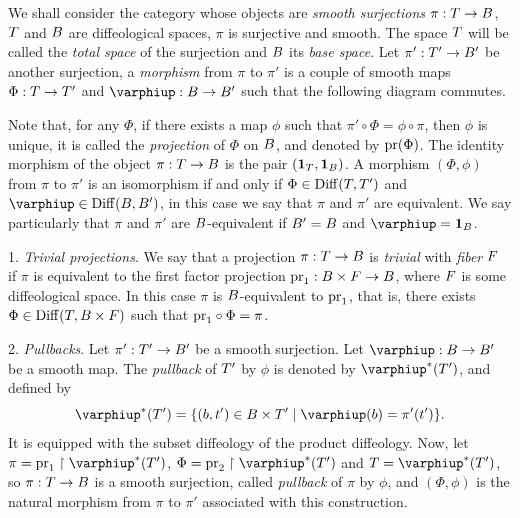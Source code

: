 \begin{article}
  \label{The-category-of-smooth-surjections}
  We shall consider the category whose objects are {\em smooth surjections} $\pi:T \to B$,
  $T$ and $B$ are diffeological spaces,
  $\pi$ is surjective and smooth.
  The space $T$ will be called the {\em total space} of the surjection and $B$ its {\em base space}.
  Let $\pi' : T' \to B'$ be another surjection,
  a {\em morphism} from $\pi$ to $\pi'$ is a couple of smooth maps $\Phi : T \to T'$ and $\phi : \B \to \B'$ such that the following diagram commutes.
  
  \begin{center}
  \end{center}

  Note that,
  for any $\Phi$,
  if there exists a map $\phi$ such that $\pi' \circ \Phi = \phi \circ \pi$,
  then $\phi$ is unique,
  it is called the {\em projection} of $\Phi$ on $B$,
  and denoted by $\mathrm{pr}(\Phi)$.
  The identity morphism of the object $\pi : T \to B$ is the pair $({\bf 1}_T, {\bf 1}_B)$.
  A morphism $(\Phi,\phi)$ from $\pi$ to $\pi'$ is an isomorphism if and only if $\Phi \in \mathrm{Diff}(T,T')$ and $\phi \in \Diff(\B,\B')$,
  in this case we say that $\pi$ and $\pi'$ are equivalent.
  We say particularly that $\pi$ and $\pi'$ are $B$-equivalent if $B'= B$ and $\phi = \id_\B$.
  
  1. {\em Trivial projections}.
  We say that a projection $\pi : T \to B$ is {\em trivial} with {\em fiber} $F$ if $\pi$ is equivalent to the first factor projection $\mathrm{pr}_1 : B \times F \to B$,
  where $F$ is some diffeological space.
  In this case $\pi$ is $B$-equivalent to $\mathrm{pr}_1$,
  that is,
  there exists $\Phi \in \mathrm{Diff}(T,B \times F)$ such that $\mathrm{pr}_1 \circ \Phi = \pi$.
  
  2. {\em Pullbacks}.
  Let $\pi' : T' \to B'$ be a smooth surjection.
  Let $\phi : \B \to \B'$ be a smooth map.
  The {\em pullback} of $T'$ by $\phi$ is denoted by $\phi^*(\T')$,
  and defined by
  $$%
  \phi^*(\T') = \{ (b,t') \in \B \times \T' \mid \phi(b) = \pi'(t') \}.
  $$%
  It is equipped with the subset diffeology of the product diffeology.
  Now,
  let $\pi = \pr_1 \restriction \phi^*(\T')$, $\Phi = \pr_2 \restriction \phi^*(\T')$ and $\T = \phi^*(\T')$, so $\pi : T \to B$ is a smooth surjection,
  called {\em pullback} of $\pi$ by $\phi$,
  and $(\Phi, \phi)$ is the natural morphism from $\pi$ to $\pi'$ associated with this construction.
  

\end{article}
